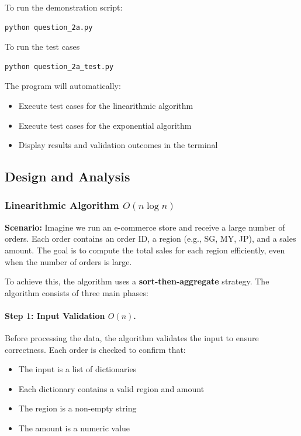 \documentclass[12pt]{article}
\begin{document}
\noindent To run the demonstration script:

\begin{lstlisting}[language=bash]
python question_2a.py
\end{lstlisting}

\noindent To run the test cases

\begin{lstlisting}[language=bash]
python question_2a_test.py
\end{lstlisting}

\noindent The program will automatically:
	      \begin{itemize}
		      \item Execute test cases for the linearithmic algorithm
		      \item Execute test cases for the exponential algorithm
		      \item Display results and validation outcomes in the terminal
	      \end{itemize}

\subsection{Design and Analysis}

\subsubsection{Linearithmic Algorithm $O(n\log n)$}

\textbf{Scenario:} Imagine we run an e-commerce store and receive a large number of orders. Each order contains an order ID, a region (e.g., SG, MY, JP), and a sales amount.  The goal is to compute the total sales for each region efficiently, even when the number of orders is large.

To achieve this, the algorithm uses a \textbf{sort-then-aggregate} strategy. The algorithm consists of three main phases:

\paragraph{Step 1: Input Validation $O(n)$.}
Before processing the data, the algorithm validates the input to ensure correctness. Each order is checked to confirm that:

\begin{itemize}
    \item The input is a list of dictionaries
    \item Each dictionary contains a valid region and amount
    \item The region is a non-empty string
    \item The amount is a numeric value
\end{itemize}
\end{document}
